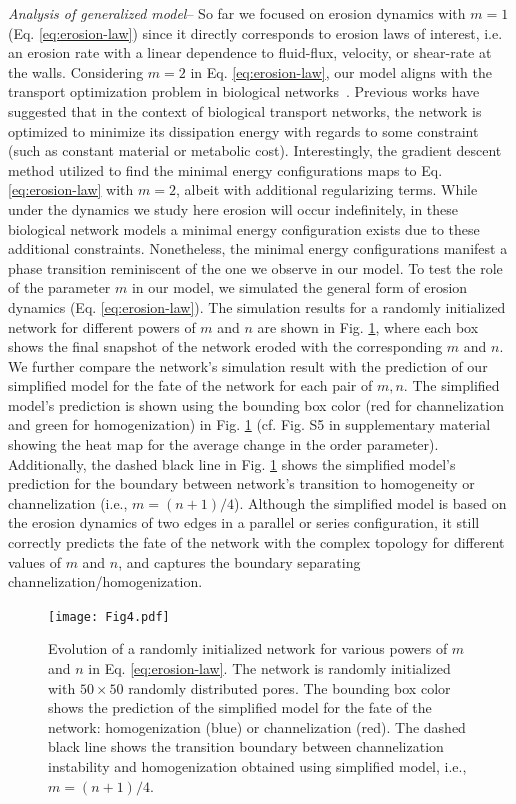 \documentclass[%
reprint,
 amsmath,amssymb,
 aps,
prl,
]{revtex4-1}
\begin{document}
\textit{Analysis of generalized model}-- So far we focused on erosion dynamics with $m=1$ (Eq. \eqref{eq:erosion-law}) since it directly corresponds to erosion laws of interest, i.e. an erosion rate with a linear dependence to fluid-flux, velocity, or shear-rate at the walls. Considering $m=2$ in Eq. \eqref{eq:erosion-law}, our model aligns with the transport optimization problem in biological networks~\cite{ronellenfitsch2016global,corson2010fluctuations,hu2013adaptation}. Previous works have suggested that in the context of biological transport networks, the network is optimized to minimize its dissipation energy with regards to some constraint (such as constant material or metabolic cost).  Interestingly, the gradient descent method utilized to find the minimal energy configurations maps to Eq. \eqref{eq:erosion-law} with $m=2$, albeit with additional regularizing terms. While under the dynamics we study here erosion will occur indefinitely, in these biological network models a minimal energy configuration exists due to these additional constraints. Nonetheless, the minimal energy configurations manifest a phase transition reminiscent of the one we observe in our model.
To test the role of the parameter $m$ in our model, we simulated the general form of erosion dynamics (Eq. \eqref{eq:erosion-law}).
The simulation results for a randomly initialized network for different powers of $m$ and $n$ are shown in Fig. \ref{fig:fig4}, where each box shows the final snapshot of the network eroded with the corresponding $m$ and $n$.  We further compare the network's simulation result with the prediction of our simplified model for the fate of the network for each pair of $m,n$. The simplified model's prediction is shown using the bounding box color (red for channelization and green for homogenization) in Fig. \ref{fig:fig4} (cf. Fig. S5 in supplementary material showing the heat map for the average change in the order parameter). Additionally, the dashed black line in Fig. \ref{fig:fig4} shows the simplified model's prediction for the boundary between network's transition to homogeneity or channelization (i.e., $m = (n+1)/4$). Although the simplified model is based on the erosion dynamics of two edges in a parallel or series configuration, it still correctly predicts the fate of the network with the complex topology for different values of $m$ and $n$, and captures the boundary separating channelization/homogenization.


\begin{figure}[!h]
    \centering
    \texttt{[image: Fig4.pdf]}
    \caption{{Evolution of a randomly initialized network for various powers of $m$ and $n$ in Eq. \eqref{eq:erosion-law}}. The network is randomly initialized with $50\times 50$ randomly distributed pores. The bounding box color shows the prediction of the simplified  model for the fate of the network: homogenization (blue) or channelization (red). The dashed black line shows the transition boundary between channelization instability and homogenization obtained using simplified model, i.e., $m=(n+1)/4$.}\label{fig:fig4}
\end{figure}
\end{document}
